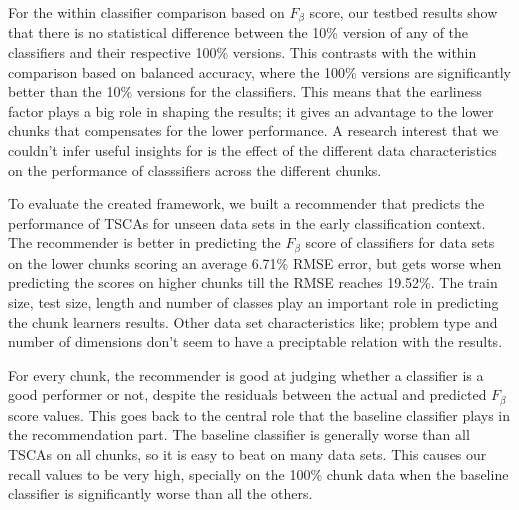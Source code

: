 For the within classifier comparison based on $F_{\beta}$ score, our testbed results show that there is no statistical difference between the 10\% version of any of the classifiers and their respective 100\% versions.
This contrasts with the within comparison based on balanced accuracy, where the 100\% versions are significantly better than the 10\% versions for the classifiers.
This means that the earliness factor plays a big role in shaping the results; it gives an advantage to the lower chunks that compensates for the lower performance.
A research interest that we couldn't infer useful insights for is the effect of the different data characteristics on the performance of classsifiers across the different chunks.

To evaluate the created framework, we built a recommender that predicts the performance of TSCAs for unseen data sets in the early classification context.
The recommender is better in predicting the $F_{\beta}$ score of classifiers for data sets on the lower chunks scoring an average 6.71\% RMSE error,
but gets worse when predicting the scores on higher chunks till the RMSE reaches 19.52\%.
The train size, test size, length and number of classes play an important role in predicting the chunk learners results.
Other data set characteristics like; problem type and number of dimensions don't seem to have a preciptable relation with the results.

For every chunk, the recommender is good at judging whether a classifier is a good performer or not, despite the residuals between the actual and predicted $F_{\beta}$ score values.
This goes back to the central role that the baseline classifier plays in the recommendation part.
The baseline classifier is generally worse than all TSCAs on all chunks, so it is easy to beat on many data sets.
This causes our recall values to be very high, specially on the 100\% chunk data when the baseline classifier is significantly worse than all the others.

